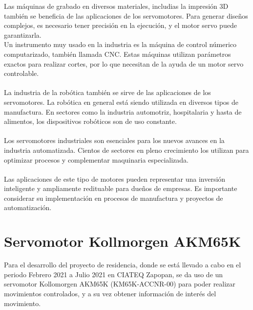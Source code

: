 \documentclass[12pt,titlepage]{article}
\begin{document}
Las máquinas de grabado en diversos materiales, includias la impresión 3D también se beneficia de las aplicaciones de los servomotores. Para generar diseños complejos, es necesario tener precisión en la ejecución, y el motor servo puede garantizarla.\\[0.8mm]

Un instrumento muy usado en la industria es la máquina de control númerico computarizado, también llamada CNC. Estas máquinas utilizan parámetros exactos para realizar cortes, por lo que necesitan de la ayuda de un motor servo controlable.\\\\

La industria de la robótica también se sirve de las aplicaciones de los servomotores. La robótica en general está siendo utilizada en diversos tipos de manufactura. En sectores como la industria automotriz, hospitalaria y hasta de alimentos, los dispositivos robóticos son de uso constante. \\\\
Los servomotores industriales son esenciales para los nuevos avances en la industria automatizada. Cientos de sectores en pleno crecimiento los utilizan para optimizar procesos y complementar maquinaria especializada. \\\\

Las aplicaciones de este tipo de motores pueden representar una inversión inteligente y ampliamente redituable para dueños de empresas. Es importante considerar su implementación en procesos de manufactura y proyectos de automatización.\\

\section{Servomotor Kollmorgen AKM65K}
Para el desarrollo del proyecto de residencia, donde se está llevado a cabo en el periodo Febrero 2021 a Julio 2021 en CIATEQ Zapopan, se da uso de un servomotor Kollomorgen AKM65K (KM65K-ACCNR-00) para poder realizar movimientos controlados, y a su vez obtener información de interés del  movimiento. 
\end{document}
